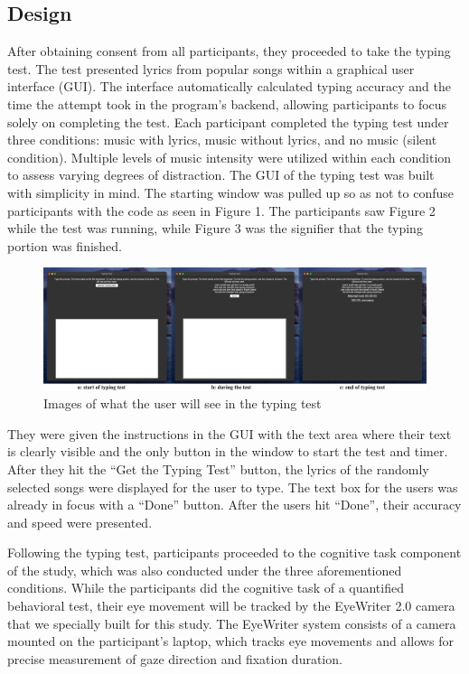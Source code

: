\documentclass[manuscript, screen, review]{acmart} %
\begin{document}
\subsection[short]{Design}
After obtaining consent from all participants, they proceeded to take the typing test. The test presented lyrics from popular songs within a graphical user interface (GUI). 
The interface automatically calculated typing accuracy and the time the attempt took in the program's backend, allowing participants to focus solely on completing the test.
Each participant completed the typing test under three conditions: music with lyrics, music without lyrics, and no music (silent condition).
Multiple levels of music intensity were utilized within each condition to assess varying degrees of distraction.
The GUI of the typing test was built with simplicity in mind. The starting window was pulled up so as not to confuse participants with the code as seen in Figure 1. The participants saw Figure 2 while the test was running, while Figure 3 was the signifier that the typing portion was finished. 

\begin{figure}
  \includegraphics[width=\textwidth]{typingTest}
  \caption{Images of what the user will see in the typing test}
\end{figure}

They were given the instructions in the GUI with the text area where their text is clearly visible and the only button in the window to start the test and timer. 
After they hit the ``Get the Typing Test'' button, the lyrics of the randomly selected songs were displayed for the user to type. 
The text box for the users was already in focus with a ``Done'' button. After the users hit ``Done'', their accuracy and speed were presented.

Following the typing test, participants proceeded to the cognitive task component of the study, which was also conducted under the three aforementioned conditions. 
While the participants did the cognitive task of a quantified behavioral test, their eye movement will be tracked by the EyeWriter 2.0 camera that we specially built for this study. 
The EyeWriter system consists of a camera mounted on the participant's laptop, which tracks eye movements and allows for precise measurement of gaze direction and fixation duration.
\end{document}
